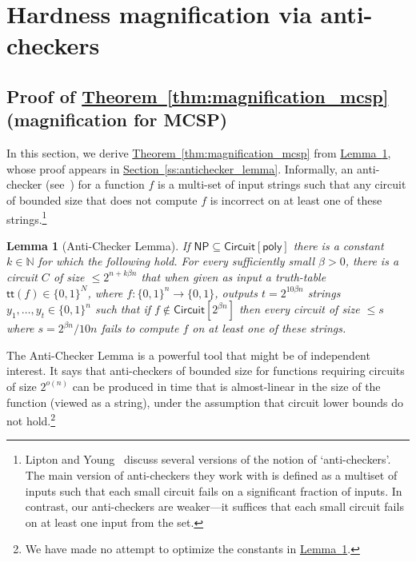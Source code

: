 \documentclass[11pt]{article}
\numberwithin{equation}{section}
\newtheorem{lemma}[theorem]{Lemma}
\theoremstyle{definition}
\theoremstyle{plain}
\newcommand{\expref}[2]{\hyperref[#2]{#1~\ref{#2}}}
\begin{document}
\section{Hardness magnification via anti-checkers}\label{s:magnification_mcsp}

\subsection{Proof of \expref{Theorem}{thm:magnification_mcsp} (magnification for MCSP)} \label{ss:proof_of_main_thm}

In this section, we derive \expref{Theorem}{thm:magnification_mcsp} from \expref{Lemma}{l:antichecker}, whose proof appears in \expref{Section}{ss:antichecker_lemma}. Informally, an anti-checker (see~\cite{DBLP:conf/stoc/LiptonY94}) for a function $f$ is a multi-set of input strings such that any circuit of bounded size that does not compute $f$ is incorrect on at least one of these strings.\footnote{Lipton and Young~\cite{DBLP:conf/stoc/LiptonY94} discuss several versions of the notion of `anti-checkers'. The main version of anti-checkers they work with is defined as a multiset of inputs such that each small circuit fails on a significant fraction of inputs. In contrast, our anti-checkers are weaker---it suffices that each small circuit fails on at least one input from the set.}

\begin{lemma}[Anti-Checker Lemma]\label{l:antichecker} If $\mathsf{NP} \subseteq \mathsf{Circuit}[\mathsf{poly}]$ there is a constant $k \in \mathbb{N}$ for which the following hold. For every sufficiently small $\beta > 0$, there is a circuit $C$ of size $\leq 2^{n + k\beta n}$ that when given as input a truth-table $\mathsf{tt}(f) \in \{0,1\}^N$, where $f \colon \{0,1\}^n \to \{0,1\}$, outputs $t = 2^{10 \beta n}$ strings $y_1, \ldots, y_t \in \{0,1\}^n$ such that if $f \notin \mathsf{Circuit}[2^{\beta n}]$ then every circuit of size $\leq s$ where $s = 2^{\beta n}/10n$ fails to compute $f$ on at least one of these strings.
\end{lemma}

The Anti-Checker Lemma is a powerful tool that might be of independent interest. It says that anti-checkers of bounded size for functions requiring circuits of size $2^{o(n)}$ can be produced in time that is almost-linear in the size of the function (viewed as a string), under the assumption that circuit lower bounds do not hold.\footnote{We have made no attempt to optimize the constants in \expref{Lemma}{l:antichecker}.}
\end{document}
